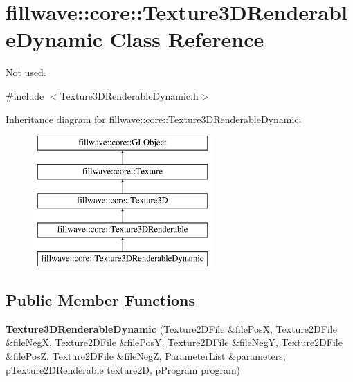 \hypertarget{classfillwave_1_1core_1_1Texture3DRenderableDynamic}{}\section{fillwave\+:\+:core\+:\+:Texture3\+D\+Renderable\+Dynamic Class Reference}
\label{classfillwave_1_1core_1_1Texture3DRenderableDynamic}


Not used.  




{\ttfamily \#include $<$Texture3\+D\+Renderable\+Dynamic.\+h$>$}

Inheritance diagram for fillwave\+:\+:core\+:\+:Texture3\+D\+Renderable\+Dynamic\+:\begin{figure}[H]
\begin{center}
\leavevmode
\includegraphics[height=5.000000cm]{classfillwave_1_1core_1_1Texture3DRenderableDynamic}
\end{center}
\end{figure}
\subsection*{Public Member Functions}
\begin{DoxyCompactItemize}
\item 
\hypertarget{classfillwave_1_1core_1_1Texture3DRenderableDynamic_a3c4d4957e456d73ef196a8e9f181e2ca}{}{\bfseries Texture3\+D\+Renderable\+Dynamic} (\hyperlink{classfillwave_1_1core_1_1Texture2DFile}{Texture2\+D\+File} \&file\+Pos\+X, \hyperlink{classfillwave_1_1core_1_1Texture2DFile}{Texture2\+D\+File} \&file\+Neg\+X, \hyperlink{classfillwave_1_1core_1_1Texture2DFile}{Texture2\+D\+File} \&file\+Pos\+Y, \hyperlink{classfillwave_1_1core_1_1Texture2DFile}{Texture2\+D\+File} \&file\+Neg\+Y, \hyperlink{classfillwave_1_1core_1_1Texture2DFile}{Texture2\+D\+File} \&file\+Pos\+Z, \hyperlink{classfillwave_1_1core_1_1Texture2DFile}{Texture2\+D\+File} \&file\+Neg\+Z, Parameter\+List \&parameters, p\+Texture2\+D\+Renderable texture2\+D, p\+Program program)\label{classfillwave_1_1core_1_1Texture3DRenderableDynamic_a3c4d4957e456d73ef196a8e9f181e2ca}

\end{DoxyCompactItemize}
